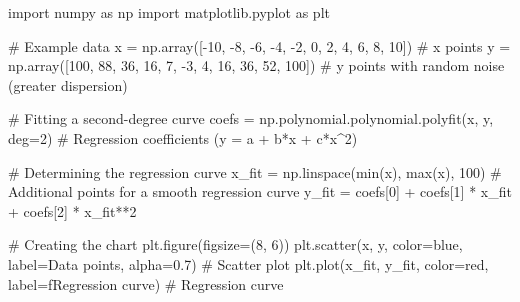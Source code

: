 \documentclass[
  english,
  letterpaper,
  DIV=11,
  numbers=noendperiod]{scrreprt}
\newenvironment{Shaded}{\begin{snugshade}}{\end{snugshade}}
\newcommand{\BuiltInTok}[1]{\textcolor[rgb]{0.00,0.23,0.31}{#1}}
\newcommand{\CommentTok}[1]{\textcolor[rgb]{0.37,0.37,0.37}{#1}}
\newcommand{\DecValTok}[1]{\textcolor[rgb]{0.68,0.00,0.00}{#1}}
\newcommand{\FloatTok}[1]{\textcolor[rgb]{0.68,0.00,0.00}{#1}}
\newcommand{\ImportTok}[1]{\textcolor[rgb]{0.00,0.46,0.62}{#1}}
\newcommand{\NormalTok}[1]{\textcolor[rgb]{0.00,0.23,0.31}{#1}}
\newcommand{\OperatorTok}[1]{\textcolor[rgb]{0.37,0.37,0.37}{#1}}
\newcommand{\SpecialStringTok}[1]{\textcolor[rgb]{0.13,0.47,0.30}{#1}}
\newcommand{\StringTok}[1]{\textcolor[rgb]{0.13,0.47,0.30}{#1}}
\begin{document}
\begin{Shaded}
\begin{Highlighting}[]
\ImportTok{import}\NormalTok{ numpy }\ImportTok{as}\NormalTok{ np}
\ImportTok{import}\NormalTok{ matplotlib.pyplot }\ImportTok{as}\NormalTok{ plt}

\CommentTok{\# Example data}
\NormalTok{x }\OperatorTok{=}\NormalTok{ np.array([}\OperatorTok{{-}}\DecValTok{10}\NormalTok{, }\OperatorTok{{-}}\DecValTok{8}\NormalTok{, }\OperatorTok{{-}}\DecValTok{6}\NormalTok{, }\OperatorTok{{-}}\DecValTok{4}\NormalTok{, }\OperatorTok{{-}}\DecValTok{2}\NormalTok{, }\DecValTok{0}\NormalTok{, }\DecValTok{2}\NormalTok{, }\DecValTok{4}\NormalTok{, }\DecValTok{6}\NormalTok{, }\DecValTok{8}\NormalTok{, }\DecValTok{10}\NormalTok{])  }\CommentTok{\# x points}
\NormalTok{y }\OperatorTok{=}\NormalTok{ np.array([}\DecValTok{100}\NormalTok{, }\DecValTok{88}\NormalTok{, }\DecValTok{36}\NormalTok{, }\DecValTok{16}\NormalTok{, }\DecValTok{7}\NormalTok{, }\OperatorTok{{-}}\DecValTok{3}\NormalTok{, }\DecValTok{4}\NormalTok{, }\DecValTok{16}\NormalTok{, }\DecValTok{36}\NormalTok{, }\DecValTok{52}\NormalTok{, }\DecValTok{100}\NormalTok{])   }\CommentTok{\# y points with random noise (greater dispersion)}

\CommentTok{\# Fitting a second{-}degree curve}
\NormalTok{coefs }\OperatorTok{=}\NormalTok{ np.polynomial.polynomial.polyfit(x, y, deg}\OperatorTok{=}\DecValTok{2}\NormalTok{)  }\CommentTok{\# Regression coefficients (y = a + b*x + c*x\^{}2)}

\CommentTok{\# Determining the regression curve}
\NormalTok{x\_fit }\OperatorTok{=}\NormalTok{ np.linspace(}\BuiltInTok{min}\NormalTok{(x), }\BuiltInTok{max}\NormalTok{(x), }\DecValTok{100}\NormalTok{)  }\CommentTok{\# Additional points for a smooth regression curve}
\NormalTok{y\_fit }\OperatorTok{=}\NormalTok{ coefs[}\DecValTok{0}\NormalTok{] }\OperatorTok{+}\NormalTok{ coefs[}\DecValTok{1}\NormalTok{] }\OperatorTok{*}\NormalTok{ x\_fit }\OperatorTok{+}\NormalTok{ coefs[}\DecValTok{2}\NormalTok{] }\OperatorTok{*}\NormalTok{ x\_fit}\OperatorTok{**}\DecValTok{2}

\CommentTok{\# Creating the chart}
\NormalTok{plt.figure(figsize}\OperatorTok{=}\NormalTok{(}\DecValTok{8}\NormalTok{, }\DecValTok{6}\NormalTok{))}
\NormalTok{plt.scatter(x, y, color}\OperatorTok{=}\StringTok{\textquotesingle{}blue\textquotesingle{}}\NormalTok{, label}\OperatorTok{=}\StringTok{\textquotesingle{}Data points\textquotesingle{}}\NormalTok{, alpha}\OperatorTok{=}\FloatTok{0.7}\NormalTok{)  }\CommentTok{\# Scatter plot}
\NormalTok{plt.plot(x\_fit, y\_fit, color}\OperatorTok{=}\StringTok{\textquotesingle{}red\textquotesingle{}}\NormalTok{, label}\OperatorTok{=}\SpecialStringTok{f\textquotesingle{}Regression curve\textquotesingle{}}\NormalTok{)  }\CommentTok{\# Regression curve}


\end{Highlighting}
\end{Shaded}
\end{document}
